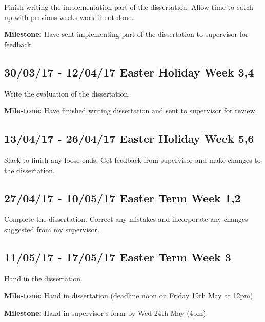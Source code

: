 \documentclass[12pt,a4paper,twoside]{article}
\begin{document}
      Finish writing the implementation part of the dissertation.
      Allow time to catch up with previous weeks work if not done.

      \textbf{Milestone:} Have sent implementing part of the dissertation to supervisor for feedback.

    \subsection*{30/03/17 - 12/04/17 \hfill Easter Holiday Week 3,4}

      Write the evaluation of the dissertation.

      \textbf{Milestone:} Have finished writing dissertation and sent to supervisor for review.


    \subsection*{13/04/17 - 26/04/17 \hfill Easter Holiday Week 5,6}

      Slack to finish any loose ends. Get feedback from supervisor and make changes to the dissertation.


    \subsection*{27/04/17 - 10/05/17 \hfill Easter Term Week 1,2}

      Complete the dissertation. Correct any mistakes and incorporate any changes suggested from my supervisor.


    \subsection*{11/05/17 - 17/05/17 \hfill Easter Term Week 3}
      Hand in the dissertation.

     \textbf{Milestone:} Hand in dissertation (deadline noon on Friday 19th May at 12pm).

     \textbf{Milestone:} Hand in supervisor's form by Wed 24th May (4pm).

     \printbibliography
\end{document}
